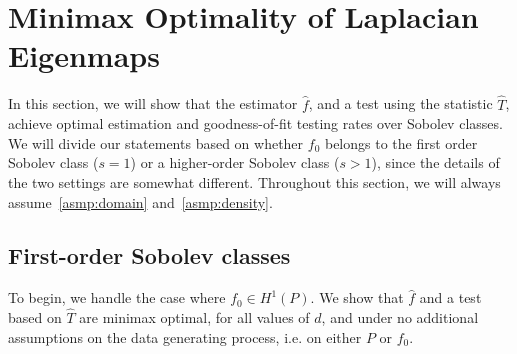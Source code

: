 \documentclass{article}
\newcommand{\1}{\mathbf{1}}
\newcommand{\wh}[1]{\widehat{#1}}
\theoremstyle{alden}
\theoremstyle{aldenthm}
\theoremstyle{definition}
\theoremstyle{remark}
\begin{document}
\section{Minimax Optimality of Laplacian Eigenmaps}
\label{sec:minimax_optimal_laplacian_eigenmaps}

In this section, we will show that the estimator $\wh{f}$, and a test using the statistic $\wh{T}$, achieve optimal estimation and goodness-of-fit testing rates over Sobolev classes. We will divide our statements based on whether $f_0$ belongs to the first order Sobolev class ($s = 1$) or a higher-order Sobolev class ($s > 1$), since the details of the two settings are somewhat different. Throughout this section, we will always assume~\ref{asmp:domain} and~\ref{asmp:density}.

\subsection{First-order Sobolev classes}
\label{sec:first_order_sobolev_classes}
To begin, we handle the case where $f_0 \in H^1(P)$. We show that $\wh{f}$ and a test based on $\wh{T}$ are minimax optimal, for all values of $d$, and under no additional assumptions on the data generating process, i.e. on either $P$ or $f_0$. 
\end{document}
